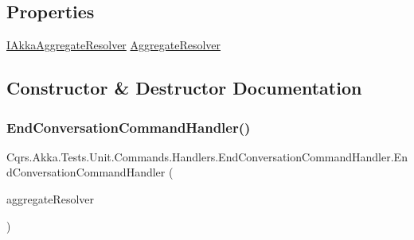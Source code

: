 \subsection*{Properties}
\begin{DoxyCompactItemize}
\item 
\hyperlink{interfaceCqrs_1_1Akka_1_1Domain_1_1IAkkaAggregateResolver}{I\+Akka\+Aggregate\+Resolver} \hyperlink{classCqrs_1_1Akka_1_1Tests_1_1Unit_1_1Commands_1_1Handlers_1_1EndConversationCommandHandler_a39a99dda0cbadd3405a4a991fd3f2163}{Aggregate\+Resolver}
\end{DoxyCompactItemize}


\subsection{Constructor \& Destructor Documentation}
\mbox{\label{classCqrs_1_1Akka_1_1Tests_1_1Unit_1_1Commands_1_1Handlers_1_1EndConversationCommandHandler_aaf3680b69f6cbad95722194c4c16cd1f}} 
\subsubsection{\texorpdfstring{End\+Conversation\+Command\+Handler()}{EndConversationCommandHandler()}}
{\footnotesize\ttfamily Cqrs.\+Akka.\+Tests.\+Unit.\+Commands.\+Handlers.\+End\+Conversation\+Command\+Handler.\+End\+Conversation\+Command\+Handler (\begin{DoxyParamCaption}\item[{\hyperlink{interfaceCqrs_1_1Akka_1_1Domain_1_1IAkkaAggregateResolver}{I\+Akka\+Aggregate\+Resolver}}]{aggregate\+Resolver }\end{DoxyParamCaption})}




